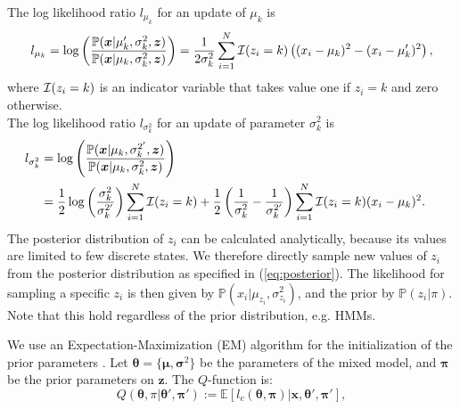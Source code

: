 \documentclass[a4paper,11pt]{article}
\def\x{\boldsymbol{x}}
\def\z{\boldsymbol{z}}
\def\bmu{\boldsymbol{\mu}}
\def\bpi{\boldsymbol{\pi}}
\def\bsigma{\boldsymbol{\sigma}}
\def\btheta{\boldsymbol{\theta}}
\def\p{\mathbb{P}}
\begin{document}
The log likelihood ratio $l_{\mu_k}$ for an update of $\mu_k$ is
\begin{equation*}
 l_{\mu_k} = \log \left(\frac{\p(\boldsymbol x | \mu_k', \sigma_k^2, \boldsymbol z)}{\p(\boldsymbol x | \mu_k, \sigma_k^2, \boldsymbol z)} \right) = \frac{1}{2\sigma_k^2} \sum_{i=1}^N {\cal I}(z_i = k) \left( (x_{i} - \mu_k)^2 - (x_{i} - \mu_k')^2 \right),
\end{equation*}
where ${\cal I}(z_i = k)$ is an indicator variable that takes value one if $z_i = k$ and zero otherwise.\\
The log likelihood ratio $l_{\sigma_k^2}$ for an update of parameter $\sigma_k^2$ is
\begin{align*}
 l_{\sigma_k^2} &= \log \left(\frac{\p(\boldsymbol x | \mu_k, \sigma_k^{2'}, \boldsymbol z)}{\p(\boldsymbol x | \mu_k, \sigma_k^2, \boldsymbol z)} \right) \\
 &= \begin{aligned}[t]
 & \frac{1}{2}\log\left(\frac{\sigma_k^2}{\sigma_k^{2'}}\right)\sum_{i=1}^N {\cal I}(z_i = k) + \frac{1}{2}\left(\frac{1}{\sigma_k^2} - \frac{1}{\sigma_k^{2'}}\right)\sum_{i=1}^N{\cal I}(z_i = k)(x_{i} - \mu_k)^2.
 \end{aligned}
\end{align*}
The posterior distribution of $z_i$ can be calculated analytically, because its values are limited to few discrete states. We therefore directly sample new values of $z_i$ from the posterior distribution as specified in (\ref{eq:posterior}). The likelihood for sampling a specific $z_i$ is then given by $\p(x_i | \mu_{z_i}, \sigma^2_{z_i})$, and the prior by $\p(z_i | \pi )$. Note that this hold regardless of the prior distribution, e.g. HMMs.

We use an Expectation-Maximization (EM) algorithm for the initialization of the prior parameters \label{pg:EM_univariate}. Let $\btheta = \{\bmu, \bsigma^2\}$ be the parameters of the mixed model, and $\bpi$ be the prior parameters on $\z$. The $Q$-function is:
\begin{equation*}
 Q(\btheta, \pi  | \btheta', \bpi') := \mathbb{E} \left[ l_c(\btheta, \bpi) \Big| \x, \btheta', \bpi' \right],
\end{equation*}
\end{document}
